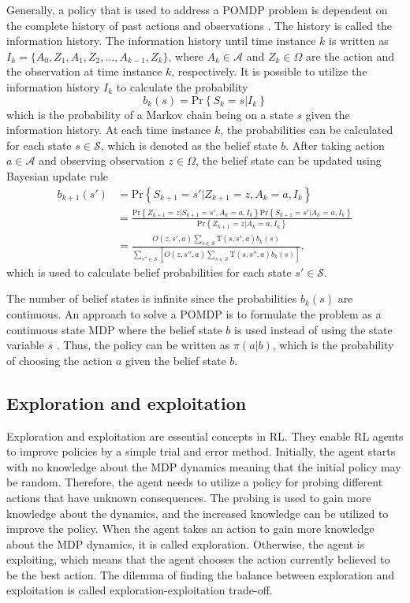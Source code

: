\documentclass[english, 12pt, a4paper, elec, utf8, a-1b, online]{aaltothesis}
\numberwithin{equation}{section}
\newcommand{\Ss}{\mathcal{S}}
\newcommand{\As}{\mathcal{A}}
\newcommand{\Os}{\Omega}
\newcommand{\Op}{O}
\renewcommand{\Pr}[1]{\text{Pr}\left\{ #1 \right\}}
\begin{document}
Generally, a policy that is used to address a POMDP problem is dependent on the complete history of past actions and observations \cite{Krishnamurthy2016}. 
The history is called the information history.
The information history until time instance $k$ is written as $I_k=\{A_0, Z_1, A_1, Z_2, ..., A_{k-1}, Z_{k}\}$, where $A_k \in \As$ and $Z_k \in \Os$ are the action and the observation at time instance $k$, respectively.
It is possible to utilize the information history $I_k$ to calculate the probability
\begin{equation}
    b_k(s) = \Pr{S_k=s|I_k}
\end{equation}
which is the probability of a Markov chain being on a state $s$ given the information history.
At each time instance $k$, the probabilities can be calculated for each state $s \in \Ss$, which is denoted as the belief state $b$.
After taking action $a \in \As$ and observing observation $z \in \Os$, the belief state can be updated using Bayesian update rule \cite{Krishnamurthy2016}
\begin{align}
    b_{k+1}(s') 
    &= \Pr{S_{k+1}=s' | Z_{k+1}=z, A_k=a, I_k} \\
    &= \frac
        {\Pr{Z_{k+1}=z | S_{k+1}=s' , A_k=a, I_k} \Pr{S_{k+1}=s'| A_k=a, I_k}}
        {\Pr{Z_{k+1}=z | A_k=a, I_k}} \\
    &= \frac
        {\Op(z, s', a) \sum_{s \in \Ss} \mathrm{T}(s, s', a) b_k(s)}
        {\sum_{s''  \in \Ss} \left[ 
            \Op(z, s'', a) \sum_{s \in \Ss} \mathrm{T}(s, s'', a) b_k(s) \right]},  \label{eq:belief_state_update}
\end{align}
which is used to calculate belief probabilities for each state $s' \in \Ss$.

The number of belief states is infinite since the probabilities $b_k(s)$ are continuous.
An approach to solve a POMDP is to formulate the problem as a continuous state MDP where the belief state $b$ is used instead of using the state variable $s$ \cite{Krishnamurthy2016}.
Thus, the policy can be written as $\pi(a | b)$, which is the probability of choosing the action $a$ given the belief state $b$.

\subsection{Exploration and exploitation}\label{sec:exp_exp}

Exploration and exploitation are essential concepts in RL. 
They enable RL agents to improve policies by a simple trial and error method.
Initially, the agent starts with no knowledge about the MDP dynamics meaning that the initial policy may be random.
Therefore, the agent needs to utilize a policy for probing different actions that have unknown consequences.
The probing is used to gain more knowledge about the dynamics, and the increased knowledge can be utilized to improve the policy.
When the agent takes an action to gain more knowledge about the MDP dynamics, it is called exploration.
Otherwise, the agent is exploiting, which means that the agent chooses the action currently believed to be the best action.
The dilemma of finding the balance between exploration and exploitation is called exploration-exploitation trade-off.
\end{document}

